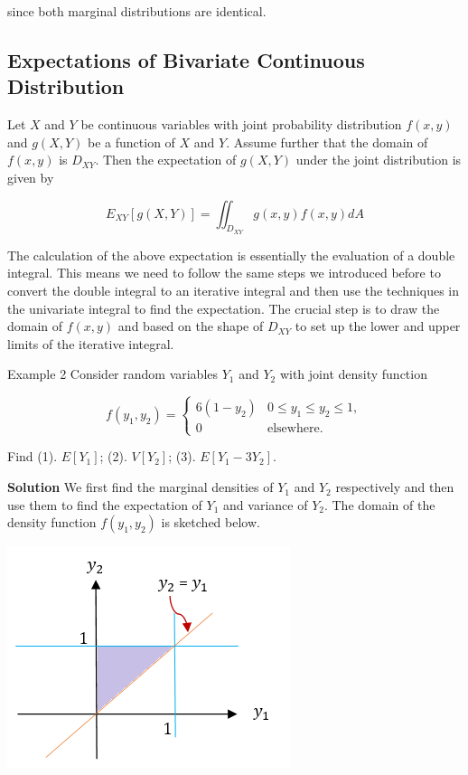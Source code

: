 \documentclass[
]{book}
\begin{document}
since both marginal distributions are identical.

\hfill\break

\hypertarget{expectations-of-bivariate-continuous-distribution}{%
\subsection{Expectations of Bivariate Continuous Distribution}\label{expectations-of-bivariate-continuous-distribution}}

Let \(X\) and \(Y\) be continuous variables with joint probability distribution \(f(x,y)\) and \(g(X, Y)\) be a function of \(X\) and \(Y\). Assume further that the domain of \(f(x,y)\) is \(D_{XY}\). Then the expectation of \(g(X, Y)\) under the joint distribution is given by

\[
E_{XY}[g(X,Y)] = \iint_{D_{XY}} g(x,y) f(x,y)dA
\]

The calculation of the above expectation is essentially the evaluation of a double integral. This means we need to follow the same steps we introduced before to convert the double integral to an iterative integral and then use the techniques in the univariate integral to find the expectation. The crucial step is to draw the domain of \(f(x,y)\) and based on the shape of \(D_{XY}\) to set up the lower and upper limits of the iterative integral.

Example 2 Consider random variables \(Y_1\) and \(Y_2\) with joint density function

\[
\displaystyle f(y_1,y_2) = \begin{cases} 
 6(1-y_2) & \text{$0 \le y_1 \le y_2 \le 1$}, \\  
 0 & \text{elsewhere}.
 \end{cases}
\]

Find (1). \(E[Y_1]\); (2). \(V[Y_2]\); (3). \(E[Y_1-3Y_2]\).

\textbf{Solution} We first find the marginal densities of \(Y_1\) and \(Y_2\) respectively and then use them to find the expectation of \(Y_1\) and variance of \(Y_2\). The domain of the density function \(f(y_1, y_2)\) is sketched below.

\begin{center}\includegraphics[width=0.35\linewidth]{topic08/expectationContExample02} \end{center}
\end{document}
